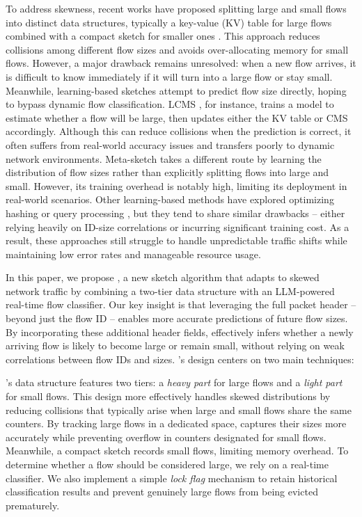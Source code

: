 To address skewness, recent works have proposed splitting large and small flows into distinct data structures, typically a key-value (KV) table for large flows combined with a compact sketch for smaller ones \cite{elasticsketch, nitrosketch, nze-sketch, bitsense}. This approach reduces collisions among different flow sizes and avoids over-allocating memory for small flows. However, a major drawback remains unresolved: when a new flow arrives, it is difficult to know immediately if it will turn into a large flow or stay small. Meanwhile, learning-based sketches attempt to predict flow size directly, hoping to bypass dynamic flow classification. LCMS \cite{lcmsketch}, for instance, trains a model to estimate whether a flow will be large, then updates either the KV table or CMS accordingly. Although this can reduce collisions when the prediction is correct, it often suffers from real-world accuracy issues and transfers poorly to dynamic network environments. Meta-sketch \cite{metasketch} takes a different route by learning the distribution of flow sizes rather than explicitly splitting flows into large and small. However, its training overhead is notably high, limiting its deployment in real-world scenarios. Other learning-based methods have explored optimizing hashing or query processing \cite{mlsketch, bertsimas2021frequency}, but they tend to share similar drawbacks -- either relying heavily on ID-size correlations or incurring significant training cost. As a result, these approaches still struggle to handle unpredictable traffic shifts while maintaining low error rates and manageable resource usage.



In this paper, we propose \alg{}, a new sketch algorithm that adapts to skewed network traffic by combining a two-tier data structure with an LLM-powered real-time flow classifier. Our key insight is that leveraging the full packet header -- beyond just the flow ID -- enables more accurate predictions of future flow sizes. By incorporating these additional header fields, \alg{} effectively infers whether a newly arriving flow is likely to become large or remain small, without relying on weak correlations between flow IDs and sizes. \alg{}’s design centers on two main techniques:


%
\alg{}’s data structure features two tiers: a \textit{heavy part} for large flows and a \textit{light part} for small flows. This design more effectively handles skewed distributions by reducing collisions that typically arise when large and small flows share the same counters. By tracking large flows in a dedicated space, \alg{} captures their sizes more accurately while preventing overflow in counters designated for small flows. Meanwhile, a compact sketch records small flows, limiting memory overhead. To determine whether a flow should be considered large, we rely on a real-time classifier. We also implement a simple \textit{lock flag} mechanism to retain historical classification results and prevent genuinely large flows from being evicted prematurely.



